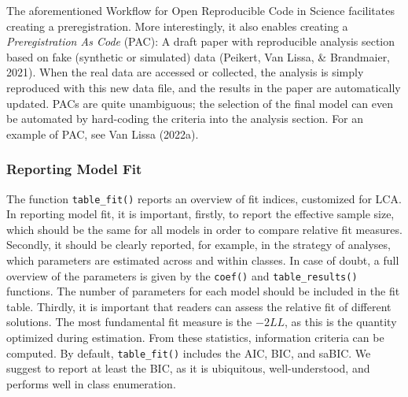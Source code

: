 \documentclass[
  ,man,floatsintext]{apa6}
\begin{document}
The aforementioned Workflow for Open Reproducible Code in Science facilitates creating a preregistration.
More interestingly, it also enables creating a \emph{Preregistration As Code} (PAC):
A draft paper with reproducible analysis section based on fake (synthetic or simulated) data (Peikert, Van Lissa, \& Brandmaier, 2021).
When the real data are accessed or collected,
the analysis is simply reproduced with this new data file,
and the results in the paper are automatically updated.
PACs are quite unambiguous; the selection of the final model can even be automated by hard-coding the criteria into the analysis section.
For an example of PAC, see Van Lissa (2022a).

\hypertarget{reporting-model-fit}{%
\subsubsection{Reporting Model Fit}\label{reporting-model-fit}}

The function \texttt{table\_fit()} reports an overview of fit indices, customized for LCA.
In reporting model fit, it is important, firstly, to report the effective sample size, which should be the same for all models in order to compare relative fit measures.
Secondly, it should be clearly reported,
for example, in the strategy of analyses,
which parameters are estimated across and within classes.
In case of doubt, a full overview of the parameters is given by the \texttt{coef()} and \texttt{table\_results()} functions.
The number of parameters for each model should be included in the fit table.
Thirdly, it is important that readers can assess the relative fit of different solutions.
The most fundamental fit measure is the \(-2LL\),
as this is the quantity optimized during estimation.
From these statistics, information criteria can be computed.
By default, \texttt{table\_fit()} includes the AIC, BIC, and saBIC.
We suggest to report at least the BIC, as it is ubiquitous, well-understood,
and performs well in class enumeration.
\end{document}
